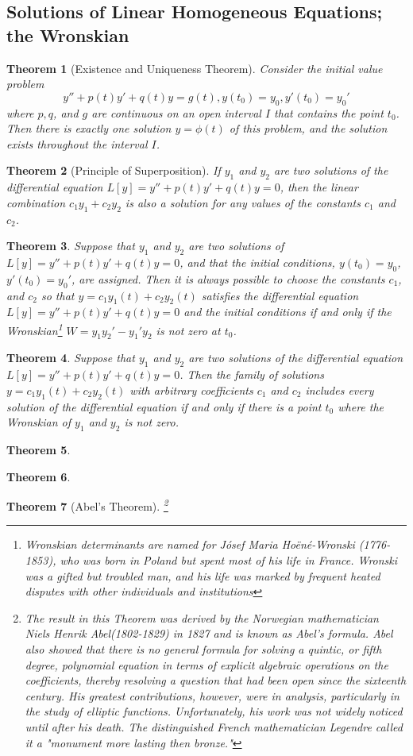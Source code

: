 \documentclass[10pt]{report}
\newtheorem{thm3}{Theorem}[subsection]
\begin{document}
\subsection{Solutions of Linear Homogeneous Equations; the Wronskian}
\begin{thm3}[Existence and Uniqueness Theorem]
Consider the initial value problem
$$y'' + p(t)y' + q(t)y=g(t), y(t_0)=y_0, y'(t_0)=y_0'$$
where $p,q$, and $g$ are continuous on an open interval $I$ that contains the point $t_0$. Then there is exactly one solution $y=\phi(t)$ of this problem, and the solution exists throughout the interval $I$.
\end{thm3}
\begin{thm3}[Principle of Superposition]
If $y_1$ and $y_2$ are two solutions of the differential equation $L[y] = y'' + p(t)y' +q(t)y=0$, then the linear combination $c_1y_1 + c_2y_2$ is also a solution for any values of the constants $c_1$ and $c_2$.
\end{thm3}
\begin{thm3}
Suppose that $y_1$ and $y_2$ are two solutions of $L[y] = y'' + p(t)y' +q(t)y=0$, and that the initial conditions, $y(t_0)=y_0$, $y'(t_0)=y_0'$, are assigned. Then it is always possible to choose the constants $c_1$, and $c_2$ so that $y=c_1y_1(t)+c_2y_2(t)$ satisfies the differential equation $L[y] = y'' + p(t)y' +q(t)y=0$ and the initial conditions if and only if the Wronskian\footnote{Wronskian determinants are named for J\'{o}sef Maria Ho\"{e}n\'{e}-Wronski (1776-1853), who was born in Poland but spent most of his life in France. Wronski was a gifted but troubled man, and his life was marked by frequent heated disputes with other individuals and institutions} $W = y_1y_2' - y_1'y_2$ is not zero at $t_0$.
\end{thm3}
\begin{thm3}
Suppose that $y_1$ and $y_2$ are two solutions of the differential equation $L[y] = y'' + p(t)y' +q(t)y=0$. Then the family of solutions $y=c_1y_1(t)+c_2y_2(t)$ with arbitrary coefficients $c_1$ and $c_2$ includes every solution of the differential equation if and only if there is a point $t_0$ where the Wronskian of $y_1$ and $y_2$ is not zero.
\end{thm3}
\begin{thm3}
\end{thm3}
\begin{thm3}
\end{thm3}
\begin{thm3}[Abel's Theorem]
\footnote{The result in this Theorem was derived by the Norwegian mathematician Niels Henrik Abel(1802-1829) in 1827 and is known as Abel's formula. Abel also showed that there is no general formula for solving a quintic, or fifth degree, polynomial equation in terms of explicit algebraic operations on the coefficients, thereby resolving a question that had been open since the sixteenth century. His greatest contributions, however, were in analysis, particularly in the study of elliptic functions. Unfortunately, his work was not widely noticed until after his death. The distinguished French mathematician Legendre called it a "monument more lasting then bronze."}
\end{thm3}
\end{document}
